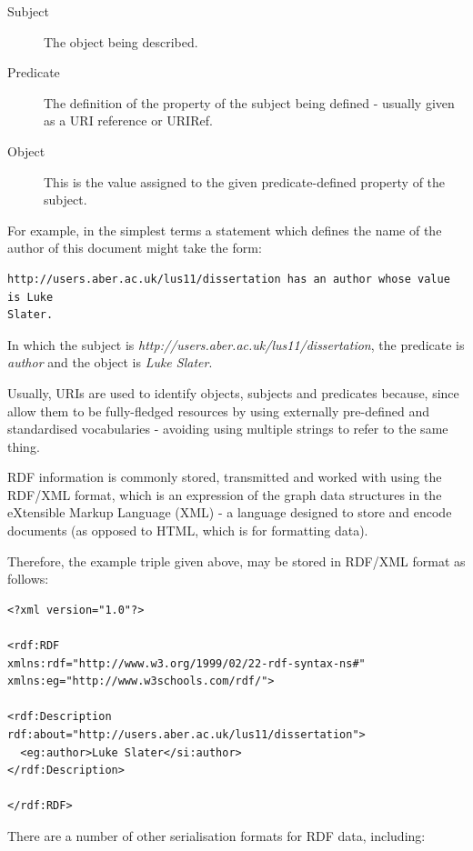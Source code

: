 \documentclass{article}
\begin{document}
\begin{description}
    \item[Subject] The object being described.
    \item[Predicate] The definition of the property of the subject being
    defined - usually given as a URI reference or URIRef.
    \item[Object] This is the value assigned to the given
    predicate-defined property of the subject.
\end{description}

For example, in the simplest terms a statement which defines the name of the author of
this document might take the form:

\begin{lstlisting}
http://users.aber.ac.uk/lus11/dissertation has an author whose value is Luke
Slater.
\end{lstlisting}

In which the subject is \emph{http://users.aber.ac.uk/lus11/dissertation}, the
predicate is \emph{author} and the object is \emph{Luke Slater}.

Usually, URIs are used to identify objects, subjects and predicates because,
since allow them to be fully-fledged resources by using externally pre-defined and
standardised vocabularies - avoiding using multiple strings to refer to the same thing.

RDF information is commonly stored, transmitted and worked with using the
RDF/XML format, which is an expression of the graph data structures in the
eXtensible Markup Language (XML)\cite{xml} - a language designed to store and encode
documents (as opposed to HTML, which is for formatting data). 

Therefore, the example triple given above, may be stored in RDF/XML format as
follows:

\begin{lstlisting}
<?xml version="1.0"?>

<rdf:RDF
xmlns:rdf="http://www.w3.org/1999/02/22-rdf-syntax-ns#"
xmlns:eg="http://www.w3schools.com/rdf/">

<rdf:Description rdf:about="http://users.aber.ac.uk/lus11/dissertation">
  <eg:author>Luke Slater</si:author>
</rdf:Description>

</rdf:RDF> 
\end{lstlisting}

There are a number of other serialisation formats for RDF data,
including:
\end{document}
